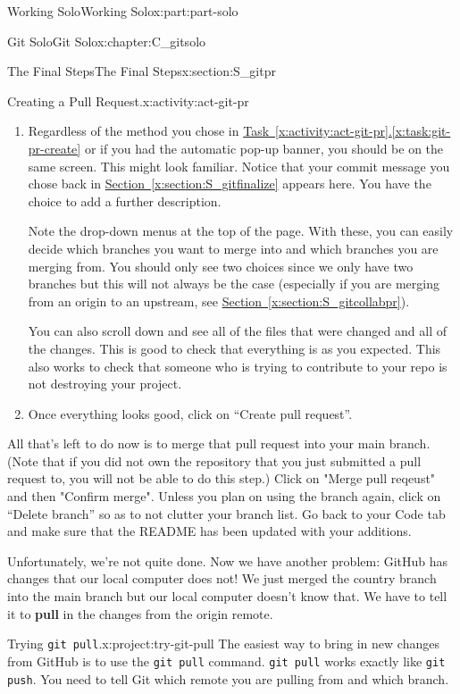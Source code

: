 \documentclass[oneside,10pt,]{book}
\newcommand{\xreffont}{\relax}
\newcommand{\mono}[1]{\texttt{#1}}
\newcommand{\terminology}[1]{\textbf{#1}}
\begin{document}
\begin{partptx}{Working Solo}{}{Working Solo}{}{}{x:part:part-solo}
\begin{chapterptx}{Git Solo}{}{Git Solo}{}{}{x:chapter:C_gitsolo}
\begin{sectionptx}{The Final Steps}{}{The Final Steps}{}{}{x:section:S_gitpr}
\begin{activity}{Creating a Pull Request.}{x:activity:act-git-pr}
\begin{enumerate}[font=\bfseries,label=(\alph*),ref=\alph*]
%
\item\label{x:task:git-pr-open}Regardless of the method you chose in \hyperref[x:task:git-pr-create]{Task~{\xreffont\ref{x:activity:act-git-pr}}.{\xreffont\ref{x:task:git-pr-create}}} or if you had the automatic pop-up banner, you should be on the same screen. This might look familiar. Notice that your commit message you chose back in \hyperref[x:section:S_gitfinalize]{Section~{\xreffont\ref{x:section:S_gitfinalize}}} appears here. You have the choice to add a further description.%
\par
Note the drop-down menus at the top of the page. With these, you can easily decide which branches you want to merge into and which branches you are merging from. You should only see two choices since we only have two branches but this will not always be the case (especially if you are merging from an origin to an upstream, see \hyperref[x:section:S_gitcollabpr]{Section~{\xreffont\ref{x:section:S_gitcollabpr}}}).%
\par
You can also scroll down and see all of the files that were changed and all of the changes. This is good to check that everything is as you expected. This also works to check that someone who is trying to contribute to your repo is not destroying your project.%
\item{}Once everything looks good, click on ``Create pull request''.%
\end{enumerate}
All that's left to do now is to merge that pull request into your main branch. (Note that if you did not own the repository that you just submitted a pull request to, you will not be able to do this step.) Click on "Merge pull reqeust" and then "Confirm merge". Unless you plan on using the branch again, click on ``Delete branch'' so as to not clutter your branch list. Go back to your Code tab and make sure that the README has been updated with your additions.%
\end{activity}%
 Unfortunately, we're not quite done. Now we have another problem: GitHub has changes that our local computer does not! We just merged the country branch into the main branch but our local computer doesn't know that. We have to tell it to \terminology{pull} in the changes from the origin remote.%
\begin{project}{Trying \mono{git pull}.}{x:project:try-git-pull}%
%
%
The easiest way to bring in new changes from GitHub is to use the \mono{git pull} command. \mono{git pull} works exactly like \mono{git push}. You need to tell Git which remote you are pulling from and which branch.%

\end{project}
\end{sectionptx}
\end{chapterptx}
\end{partptx}
\end{document}
